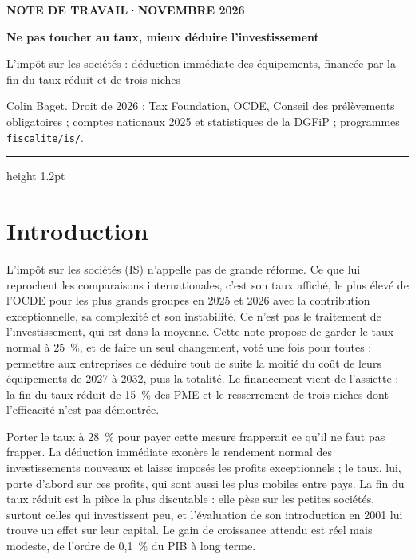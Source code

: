 \documentclass[11pt,a4paper]{article}
\begin{document}
\renewcommand{\figurename}{Figure}\renewcommand{\tablename}{Tableau}

\thispagestyle{empty}
\vspace*{0.6cm}
{\footnotesize\color{ocre}\bfseries NOTE DE TRAVAIL\quad·\quad NOVEMBRE 2026\par}
\vspace{8pt}
{\fontsize{22}{26}\selectfont\bfseries\color{bleu}Ne pas toucher au taux, mieux déduire
l'investissement\par}
\vspace{6pt}
{\large L'impôt sur les sociétés : déduction immédiate des équipements, financée par la fin du taux réduit
et de trois niches\par}
\vspace{8pt}
{\small Colin Baget. Droit de 2026 ; Tax Foundation, OCDE, Conseil des prélèvements obligatoires ; comptes
nationaux 2025 et statistiques de la DGFiP ; programmes \texttt{fiscalite/is/}.\par}
\vspace{6pt}
{\color{bleu}\hrule height 1.2pt}
\vspace{4pt}

\section*{Introduction}

L'impôt sur les sociétés (IS) n'appelle pas de grande réforme. Ce que lui reprochent les comparaisons
internationales, c'est son taux affiché, le plus élevé de l'OCDE pour les plus grands groupes en 2025 et 2026
avec la contribution exceptionnelle, sa complexité et son instabilité. Ce n'est pas le traitement de
l'investissement, qui est dans la moyenne. Cette note propose de garder le taux normal à 25~\%, et de faire
un seul changement, voté une fois pour toutes : permettre aux entreprises de déduire tout de suite la moitié
du coût de leurs équipements de 2027 à 2032, puis la totalité. Le financement vient de l'assiette : la fin du
taux réduit de 15~\% des PME et le resserrement de trois niches dont l'efficacité n'est pas démontrée.

Porter le taux à 28~\% pour payer cette mesure frapperait ce qu'il ne faut pas frapper. La déduction
immédiate exonère le rendement normal des investissements nouveaux et laisse imposés les profits
exceptionnels ; le taux, lui, porte d'abord sur ces profits, qui sont aussi les plus mobiles entre pays.
La fin du taux réduit est la pièce la plus discutable : elle pèse sur les petites sociétés, surtout celles
qui investissent peu, et l'évaluation de son introduction en 2001 lui trouve un effet sur leur capital. Le
gain de croissance attendu est réel mais modeste, de l'ordre de 0,1~\% du PIB à long terme.
\end{document}
